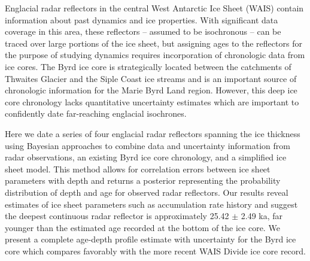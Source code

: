 Englacial radar reflectors in the central West Antarctic Ice Sheet (WAIS) contain information about past dynamics and ice properties. With significant data coverage in this area, these reflectors -- assumed to be isochronous --  can be traced over large portions of the ice sheet, but assigning ages to the reflectors for the purpose of studying dynamics requires incorporation of chronologic data from ice cores. The Byrd ice core is strategically located between the catchments of Thwaites Glacier and the Siple Coast ice streams and is an important source of chronologic information for the Marie Byrd Land region. However, this deep ice core chronology lacks quantitative uncertainty estimates which are important to confidently date far-reaching englacial isochrones. 

Here we date a series of four englacial radar reflectors spanning the ice thickness using Bayesian approaches to combine data and uncertainty information from radar observations, an existing Byrd ice core chronology, and a simplified ice sheet model. This method allows for correlation errors between ice sheet parameters with depth and returns a posterior representing the probability distribution of depth and age for observed radar reflectors. Our results reveal estimates of ice sheet parameters such as accumulation rate history and suggest the deepest continuous radar reflector is approximately 25.42 $\pm$ 2.49 ka, far younger than the estimated age recorded at the bottom of the ice core. We present a complete age-depth profile estimate with uncertainty for the Byrd ice core which compares favorably with the more recent WAIS Divide ice core record. 